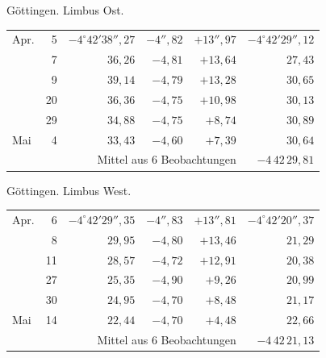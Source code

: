 \noindent\begin{minipage}[t]{.495\textwidth}\centering Göttingen. Limbus Ost.\par\smallskip
{\scriptsize\setlength{\tabcolsep}{1pt}\renewcommand{\arraystretch}{1.2}\begin{tabular}{lr|r|r|r|r|}
Apr.&5&$-4^\circ42'38''{,}27$&$-4''{,}82$&$+13''{,}97$&$-4^\circ42'29''{,}12$\\
&7&$36{,}26$&$-4{,}81$&$+13{,}64$&$27{,}43$\\
&9&$39{,}14$&$-4{,}79$&$+13{,}28$&$30{,}65$\\
&20&$36{,}36$&$-4{,}75$&$+10{,}98$&$30{,}13$\\
&29&$34{,}88$&$-4{,}75$&$+8{,}74$&$30{,}89$\\
Mai&4&$33{,}43$&$-4{,}60$&$+7{,}39$&$30{,}64$\\
\cline{6-6}\multicolumn{5}{r}{Mittel aus 6 Beobachtungen}&$-4\,42\,29{,}81$
\end{tabular}}\end{minipage}\hfill\begin{minipage}[t]{.495\textwidth}\centering Göttingen. Limbus West.\par\smallskip
{\scriptsize\setlength{\tabcolsep}{1pt}\renewcommand{\arraystretch}{1.2}\begin{tabular}{lr|r|r|r|r}
Apr.&6&$-4^\circ42'29''{,}35$&$-4''{,}83$&$+13''{,}81$&$-4^\circ42'20''{,}37$\\
&8&$29{,}95$&$-4{,}80$&$+13{,}46$&$21{,}29$\\
&11&$28{,}57$&$-4{,}72$&$+12{,}91$&$20{,}38$\\
&27&$25{,}35$&$-4{,}90$&$+9{,}26$&$20{,}99$\\
&30&$24{,}95$&$-4{,}70$&$+8{,}48$&$21{,}17$\\
Mai&14&$22{,}44$&$-4{,}70$&$+4{,}48$&$22{,}66$\\
\cline{6-6}\multicolumn{5}{r}{Mittel aus 6 Beobachtungen}&$-4\,42\,21{,}13$
\end{tabular}}\end{minipage}
\par\vspace{4mm}

